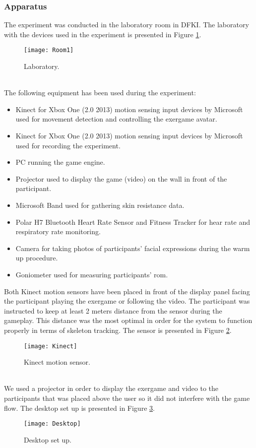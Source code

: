\subsubsection{Apparatus}
The experiment was conducted in the laboratory room in DFKI. The laboratory with the devices used in the experiment is presented in Figure \ref{fig:lab1}.\\ 
\begin{figure}[h]
    \centering
    \texttt{[image: Room1]}
    \caption{Laboratory.}
    \label{fig:lab1}
\end{figure}\\
The following equipment has been used during the experiment:
\begin{itemize}
\item Kinect for Xbox One (2.0 2013) motion sensing input devices by Microsoft used for movement detection and controlling the exergame avatar. 
\item Kinect for Xbox One (2.0 2013) motion sensing input devices by Microsoft used for recording the experiment. 
\item PC running the game engine.
\item Projector used to display the game (video) on the wall in front of the participant.
\item Microsoft Band used for gathering skin resistance data.
\item Polar H7 Bluetooth Heart Rate Sensor and Fitness Tracker for hear rate and respiratory rate monitoring.
\item Camera for taking photos of participants' facial expressions during the warm up procedure.
\item Goniometer used for measuring participants' \acrshort{rom}.
\end{itemize}\pagebreak
Both Kinect motion sensors have been placed in front of the display panel facing the participant playing the exergame or following the video. The participant was instructed to keep at least 2 meters distance from the sensor during the gameplay. This distance was the most optimal in order for the system to function properly in terms of skeleton tracking. The sensor is presented in Figure \ref{fig:kinect}.\\
\begin{figure}[h]
    \centering
    \texttt{[image: Kinect]}
    \caption{Kinect motion sensor.}
    \label{fig:kinect}
\end{figure}\\
We used a projector in order to display the exergame and video to the participants that was placed above the user so it did not interfere with the game flow. The desktop set up is presented in Figure \ref{fig:desktop}.\\
\begin{figure}[h]
    \centering
    \texttt{[image: Desktop]}
    \caption{Desktop set up.}
    \label{fig:desktop}
\end{figure}
